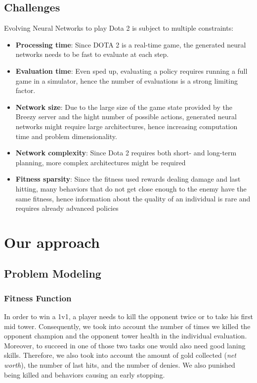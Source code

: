 \subsection{Challenges}
\begin{minipage}{\linewidth}
Evolving Neural Networks to play Dota 2 is subject to multiple constraints:
\begin{itemize}
    \item \textbf{Processing time}: Since DOTA 2 is a real-time game, the generated neural networks needs to be fast to evaluate at each step.
    \item \textbf{Evaluation time}: Even sped up, evaluating a policy requires running a full game in a simulator, hence the number of evaluations is a strong limiting factor.
    \item \textbf{Network size}: Due to the large size of the game state provided by the Breezy server and the hight number of possible actions, generated neural networks might require large architectures, hence increasing computation time and problem dimensionality.
    \item\textbf{Network complexity}: Since Dota 2 requires both short- and long-term planning, more complex architectures might be required 
    \item \textbf{Fitness sparsity}: Since the fitness used rewards dealing damage and last hitting, many behaviors that do not get close enough to the enemy have the same fitness, hence information about the quality of an individual is rare and requires already advanced policies
\end{itemize}
\end{minipage}

\section{Our approach}

\subsection{Problem Modeling}
\label{sec:representation choice}

\subsubsection{Fitness Function}
In order to win a 1v1, a player needs to kill the opponent twice or to take his first mid tower. Consequently, we took into account the number of times we killed the opponent champion and the opponent tower health in the individual evaluation. Moreover, to succeed in one of those two tasks one would also need good laning skills. Therefore, we also took into account the amount of gold collected (\textit{net worth}), the number of last hits, and the number of denies. We also punished being killed and behaviors causing an early stopping.

